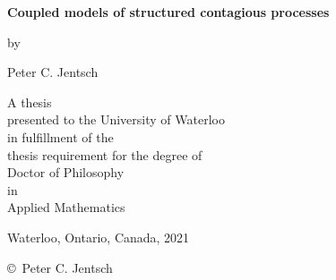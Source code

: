 \pagestyle{empty}

\begin{titlepage}
        \begin{center}
        \vspace*{1.0cm}

        \Huge
        {\bf Coupled models of structured contagious processes}

        \vspace*{1.0cm}

        \normalsize
        by \\

        \vspace*{1.0cm}

        \Large
        Peter C. Jentsch \\

        \vspace*{3.0cm}

        \normalsize
        A thesis \\
        presented to the University of Waterloo \\ 
        in fulfillment of the \\
        thesis requirement for the degree of \\
        Doctor of Philosophy \\
        in \\
        Applied Mathematics \\

        \vspace*{2.0cm}

        Waterloo, Ontario, Canada, 2021 \\

        \vspace*{1.0cm}

        \copyright\ Peter C. Jentsch \\
        \end{center}
\end{titlepage}

\pagestyle{plain}
\setcounter{page}{2}

